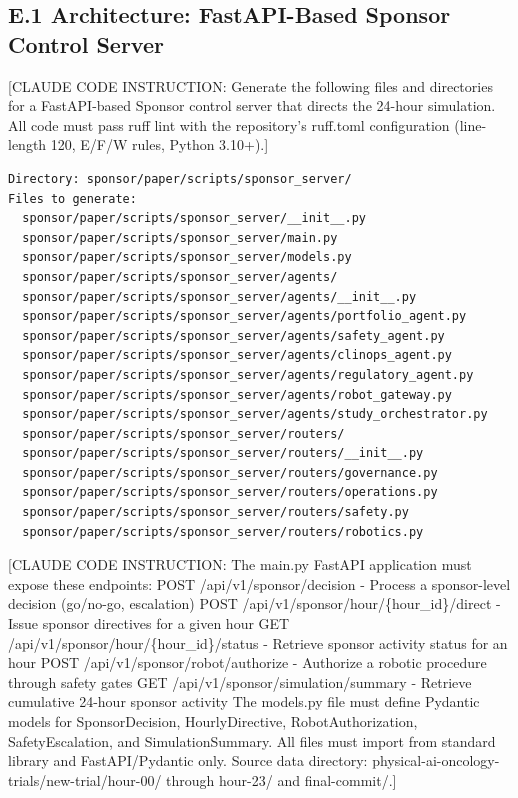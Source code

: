 \subsection*{E.1 Architecture: FastAPI-Based Sponsor Control Server}

[CLAUDE CODE INSTRUCTION: Generate the following files and directories for a FastAPI-based
Sponsor control server that directs the 24-hour simulation. All code must pass ruff lint
with the repository's ruff.toml configuration (line-length 120, E/F/W rules, Python 3.10+).]

\begin{verbatim}
Directory: sponsor/paper/scripts/sponsor_server/
Files to generate:
  sponsor/paper/scripts/sponsor_server/__init__.py
  sponsor/paper/scripts/sponsor_server/main.py
  sponsor/paper/scripts/sponsor_server/models.py
  sponsor/paper/scripts/sponsor_server/agents/
  sponsor/paper/scripts/sponsor_server/agents/__init__.py
  sponsor/paper/scripts/sponsor_server/agents/portfolio_agent.py
  sponsor/paper/scripts/sponsor_server/agents/safety_agent.py
  sponsor/paper/scripts/sponsor_server/agents/clinops_agent.py
  sponsor/paper/scripts/sponsor_server/agents/regulatory_agent.py
  sponsor/paper/scripts/sponsor_server/agents/robot_gateway.py
  sponsor/paper/scripts/sponsor_server/agents/study_orchestrator.py
  sponsor/paper/scripts/sponsor_server/routers/
  sponsor/paper/scripts/sponsor_server/routers/__init__.py
  sponsor/paper/scripts/sponsor_server/routers/governance.py
  sponsor/paper/scripts/sponsor_server/routers/operations.py
  sponsor/paper/scripts/sponsor_server/routers/safety.py
  sponsor/paper/scripts/sponsor_server/routers/robotics.py
\end{verbatim}

[CLAUDE CODE INSTRUCTION: The main.py FastAPI application must expose these endpoints:
POST /api/v1/sponsor/decision - Process a sponsor-level decision (go/no-go, escalation)
POST /api/v1/sponsor/hour/\{hour\_id\}/direct - Issue sponsor directives for a given hour
GET /api/v1/sponsor/hour/\{hour\_id\}/status - Retrieve sponsor activity status for an hour
POST /api/v1/sponsor/robot/authorize - Authorize a robotic procedure through safety gates
GET /api/v1/sponsor/simulation/summary - Retrieve cumulative 24-hour sponsor activity
The models.py file must define Pydantic models for SponsorDecision, HourlyDirective,
RobotAuthorization, SafetyEscalation, and SimulationSummary. All files must import
from standard library and FastAPI/Pydantic only. Source data directory:
physical-ai-oncology-trials/new-trial/hour-00/ through hour-23/ and final-commit/.]

